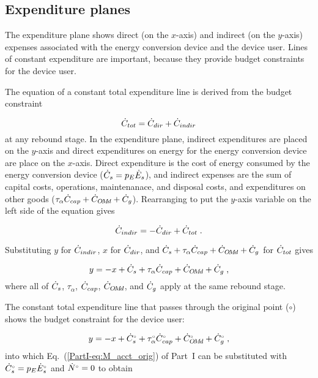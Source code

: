 \subsection{Expenditure planes}
\label{sec:expenditure_path_graph_details}

The expenditure plane shows direct (on the $x$-axis) and indirect (on the $y$-axis)
expenses associated with the energy conversion device 
and the device user.
Lines of constant expenditure are important, 
because they provide budget constraints for the device user.

The equation of a constant total expenditure line is derived from 
the budget constraint

\begin{equation}
  \dot{C}_{tot} = \dot{C}_{dir} + \dot{C}_{indir}
\end{equation}
%
at any rebound stage.
In the expenditure plane,
indirect expenditures are placed on the $y$-axis
and direct expenditures on energy for the energy conversion device are place on the $x$-axis.
Direct expenditure is the cost of energy consumed by the energy conversion device
($\dot{C}_s = p_E \dot{E}_s$), and 
indirect expenses are the sum of capital costs,
operations, maintenanace, and disposal costs, and 
expenditures on other goods
($\tau_\alpha \dot{C}_{cap} + \dot{C}_{O\!M\!d} + \dot{C}_g$).
Rearranging to put the $y$-axis variable on the left side of the equation gives

\begin{equation}
  \dot{C}_{indir} = - \dot{C}_{dir} + \dot{C}_{tot} \; .
\end{equation}

Substituting $y$ for $\dot{C}_{indir}$, 
$x$ for $\dot{C}_{dir}$, and 
$\dot{C}_s + \tau_\alpha \dot{C}_{cap} + \dot{C}_{O\!M\!d} + \dot{C}_g$ for $\dot{C}_{tot}$
gives

\begin{equation}
  y = -x + \dot{C}_s + \tau_\alpha \dot{C}_{cap} + \dot{C}_{O\!M\!d} + \dot{C}_g \; ,
\end{equation}
%
where all of $\dot{C}_s$, $\tau_\alpha$, $\dot{C}_{cap}$, $\dot{C}_{O\!M\!d}$, and $\dot{C}_g$
apply at the same rebound stage.

The constant total expenditure line 
that passes through the original point ($\circ$)
shows the budget constraint for the device user:

\begin{equation}
  y = -x + {}{\dot{C}}^{\scriptscriptstyle \circ}_s + {}{\tau}^{\scriptscriptstyle \circ}_\alpha {}{\dot{C}}^{\scriptscriptstyle \circ}_{cap} + {}{\dot{C}}^{\scriptscriptstyle \circ}_{O\!M\!d} + {}{\dot{C}}^{\scriptscriptstyle \circ}_g \; ,
\end{equation}
%
into which Eq.~(\ref{PartI-eq:M_acct_orig}) of Part~I can be substituted with 
${}{\dot{C}}^{\scriptscriptstyle \circ}_s = p_E {}{\dot{E}}^{\scriptscriptstyle \circ}_s$ and 
${}{\dot{N}}^{\scriptscriptstyle \circ} = 0$ to obtain

